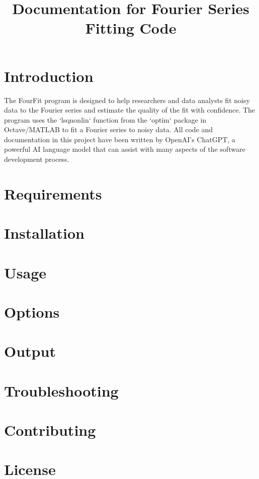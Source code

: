 \documentclass{article}
\begin{document}
\title{Documentation for Fourier Series Fitting Code}
\maketitle
\section{Introduction}
The FourFit program is designed to help researchers and data analysts fit noisy data to the Fourier series and estimate the quality of the fit with confidence. The program uses the `lsqnonlin` function from the `optim` package in Octave/MATLAB to fit a Fourier series to noisy data. All code and documentation in this project have been written by OpenAI's ChatGPT, a powerful AI language model that can assist with many aspects of the software development process.



\section{Requirements}

\section{Installation}

\section{Usage}

\section{Options}

\section{Output}

\section{Troubleshooting}

\section{Contributing}

\section{License}
\end{document}
